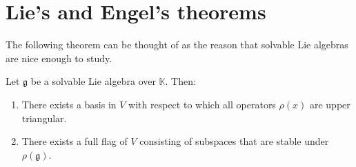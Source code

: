 \documentclass{report}
\begin{document}
\section{Lie's and Engel's theorems}
The following theorem can be thought of as the reason that solvable Lie algebras are nice enough to study.
\begin{theorem}
    Let $\mathfrak g$ be a solvable Lie algebra over $\mathbb K$. Then:
    \begin{enumerate}
        \item There exists a basis in $V$ with respect to which all operators $\rho(x)$ are upper triangular.
        \item There exists a full flag of $V$ consisting of subspaces that are stable under $\rho(\mathfrak g)$.
    \end{enumerate}
    
\end{theorem}
\end{document}
